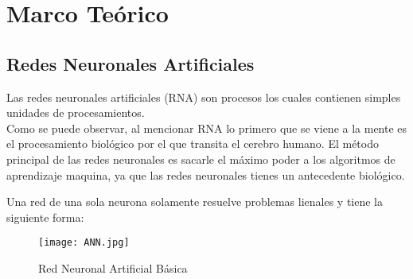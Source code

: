 \section{Marco Teórico}

    \subsection{Redes Neuronales Artificiales}
        Las redes neuronales artificiales (RNA) son procesos los cuales contienen simples
        unidades de procesamientos. \\
        Como se puede observar, al mencionar RNA lo primero que se viene a la mente es el 
        procesamiento biol\'ogico por el que transita el cerebro humano. El m\'etodo principal 
        de las redes neuronales es sacarle el máximo poder a los algoritmos de aprendizaje 
        maquina, ya que las redes neuronales tienes un antecedente biol\'ogico.

        Una red de una sola neurona solamente resuelve problemas lienales y tiene la 
        siguiente forma:
        \begin{figure}[H]
            \centering
            \texttt{[image: ANN.jpg]}
            \caption{Red Neuronal Artificial B\'asica}
            \label{fig:fig1}
        \end{figure}

